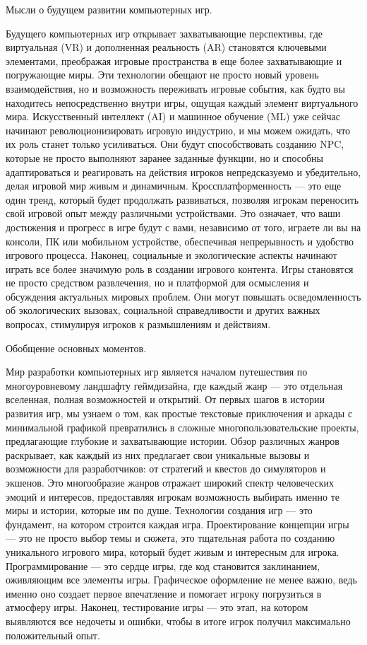Мысли о будущем развитии компьютерных игр.\newline

Будущего компьютерных игр открывает захватывающие перспективы, где виртуальная (VR) и дополненная реальность (AR) становятся ключевыми элементами, преображая игровые пространства в еще более захватывающие и погружающие миры. Эти технологии обещают не просто новый уровень взаимодействия, но и возможность переживать игровые события, как будто вы находитесь непосредственно внутри игры, ощущая каждый элемент виртуального мира.\newline
Искусственный интеллект (AI) и машинное обучение (ML) уже сейчас начинают революционизировать игровую индустрию, и мы можем ожидать, что их роль станет только усиливаться. Они будут способствовать созданию NPC, которые не просто выполняют заранее заданные функции, но и способны адаптироваться и реагировать на действия игроков непредсказуемо и убедительно, делая игровой мир живым и динамичным.
Кроссплатформенность — это еще один тренд, который будет продолжать развиваться, позволяя игрокам переносить свой игровой опыт между различными устройствами. Это означает, что ваши достижения и прогресс в игре будут с вами, независимо от того, играете ли вы на консоли, ПК или мобильном устройстве, обеспечивая непрерывность и удобство игрового процесса.
Наконец, социальные и экологические аспекты начинают играть все более значимую роль в создании игрового контента. Игры становятся не просто средством развлечения, но и платформой для осмысления и обсуждения актуальных мировых проблем. Они могут повышать осведомленность об экологических вызовах, социальной справедливости и других важных вопросах, стимулируя игроков к размышлениям и действиям.\newline

Обобщение основных моментов.

Мир разработки компьютерных игр является началом путешествия по многоуровневому ландшафту геймдизайна, где каждый жанр — это отдельная вселенная, полная возможностей и открытий. От первых шагов в истории развития игр, мы узнаем о том, как простые текстовые приключения и аркады с минимальной графикой превратились в сложные многопользовательские проекты, предлагающие глубокие и захватывающие истории.
Обзор различных жанров раскрывает, как каждый из них предлагает свои уникальные вызовы и возможности для разработчиков: от стратегий и квестов до симуляторов и экшенов. Это многообразие жанров отражает широкий спектр человеческих эмоций и интересов, предоставляя игрокам возможность выбирать именно те миры и истории, которые им по душе.
Технологии создания игр — это фундамент, на котором строится каждая игра. Проектирование концепции игры — это не просто выбор темы и сюжета, это тщательная работа по созданию уникального игрового мира, который будет живым и интересным для игрока. Программирование — это сердце игры, где код становится заклинанием, оживляющим все элементы игры. Графическое оформление не менее важно, ведь именно оно создает первое впечатление и помогает игроку погрузиться в атмосферу игры. Наконец, тестирование игры — это этап, на котором выявляются все недочеты и ошибки, чтобы в итоге игрок получил максимально положительный опыт.

